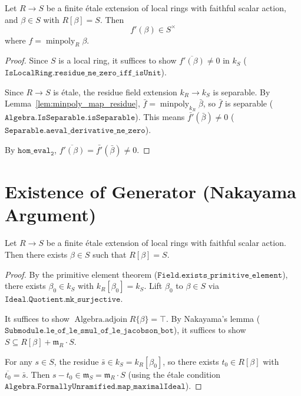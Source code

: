 \begin{theorem}
  \label{thm:isUnit_aeval_derivative_minpoly}
  \leanok
  Let $R \to S$ be a finite étale extension of local rings with faithful
  scalar action, and $\beta \in S$ with $R[\beta] = S$.  Then
  \[
    f'(\beta) \in S^\times
  \]
  where $f = \operatorname{minpoly}_R \beta$.
\end{theorem}

\begin{proof}
  \leanok
  Since $S$ is a local ring, it suffices to show
  $\overline{f'(\beta)} \ne 0$ in $k_S$
  ($\mathtt{IsLocalRing.}\allowbreak\mathtt{residue\_ne\_zero\_iff\_isUnit}$).

  Since $R \to S$ is étale, the residue field extension $k_R \to k_S$ is
  separable.  By Lemma~\ref{lem:minpoly_map_residue},
  $\bar f = \operatorname{minpoly}_{k_R} \bar\beta$,
  so $\bar f$ is separable
  ($\mathtt{Algebra.IsSeparable.isSeparable}$).
  This means $\bar{f'}(\bar\beta) \ne 0$
  ($\mathtt{Separable.aeval\_derivative\_ne\_zero}$).

  By $\mathtt{hom\_eval_2}$, $\overline{f'(\beta)} = \bar{f'}(\bar\beta) \ne 0$.
\end{proof}

\section{Existence of Generator (Nakayama Argument)}

\begin{theorem}
  \label{thm:exists_adjoin_eq_top}
  \leanok
  Let $R \to S$ be a finite étale extension of local rings with faithful
  scalar action.  Then there exists $\beta \in S$ such that $R[\beta] = S$.
\end{theorem}

\begin{proof}
  \leanok
  By the primitive element theorem
  ($\mathtt{Field.exists\_primitive\_element}$),
  there exists $\beta_0 \in k_S$ with $k_R[\beta_0] = k_S$.
  Lift $\beta_0$ to $\beta \in S$ via
  $\mathtt{Ideal.Quotient.mk\_surjective}$.

  It suffices to show $\operatorname{Algebra.adjoin} R \{\beta\} = \top$.
  By Nakayama's lemma ($\mathtt{Submodule.}\allowbreak\mathtt{le\_of\_le\_smul\_of\_le\_jacobson\_bot}$),
  it suffices to show $S \subseteq R[\beta] + \mathfrak{m}_R \cdot S$.

  For any $s \in S$, the residue $\bar s \in k_S = k_R[\beta_0]$, so there exists
  $t_0 \in R[\beta]$ with $\overline{t_0} = \bar s$.  Then
  $s - t_0 \in \mathfrak{m}_S = \mathfrak{m}_R \cdot S$
  (using the étale condition
  $\mathtt{Algebra.FormallyUnramified.map\_maximalIdeal}$).
\end{proof}


